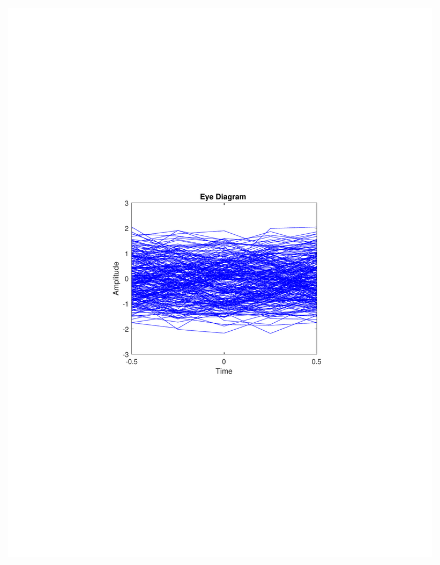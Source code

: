 \begin{refsection}
\begin{figure}[H]
\begin{minipage}{0.30\textwidth}
		\includegraphics[clip, trim=4cm 8cm 4cm 8cm, width=1\textwidth]{./sdf/m_qam_system/figures/expResults/homodyne/2_eye_4GBdInSig13dB_AfMF.pdf}
		\label{fig:4GBdSpecMF}
	\end{minipage}
	\begin{minipage}{0.30\textwidth}
		\centering

\end{minipage}
\end{figure}
\end{refsection}
